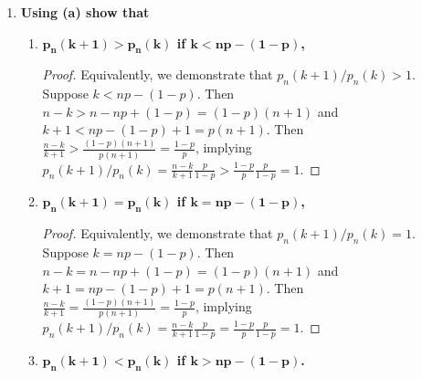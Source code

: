 \documentclass[10pt, oneside]{article}
\begin{document}
\begin{enumerate}[label=4.\arabic*]
\begin{enumerate}
	\begin{proof}
	We have $p_n (k + 1) = \binom{n}{k+1} p^{k+1} (1-p)^{n-(k+1)} = \frac{n!}{(k+1)! (n- (k+1))!} p^{k+1} (1-p)^{n-(k+1)}$ and $p_n (k) = \binom{n}{k} p^k (1-p)^{n-k} = \frac{n!}{k! (n-k)!}  p^k (1-p)^{n-k}$. It immediately follows that $p_n (k+1) / p_n (k) = [(n-k) / (k+1)] [p / (1 - p)]$.
	\end{proof}
	
	\item  \begin{tcolorbox}[
	  colback=Cerulean!5!white,
	  colframe=Cerulean!75!black]
	\textbf{Using (a) show that}
	\end{tcolorbox}
	
		\begin{enumerate}
		\item  \begin{tcolorbox}[
	  	colback=Cerulean!5!white,
	  	colframe=Cerulean!75!black]
		\textbf{$\bm{p_n (k + 1) > p_n (k)}$ if $\bm{k < np - (1 - p)}$,}
		\end{tcolorbox}
		
		\begin{proof}
		Equivalently, we demonstrate that $p_n (k+1) / p_n (k) > 1$. Suppose $k < np - (1 - p)$. Then $n - k > n - np + (1-p) = (1 - p)(n + 1)$ and $k + 1 < np - (1 - p) + 1 = p(n+1)$. Then $\frac{n-k}{k+1} > \frac{(1-p)(n+1)}{p(n+1)} = \frac{1-p}{p}$, implying $p_n (k+1) / p_n (k) = \frac{n-k}{k+1} \frac{p}{1-p} > \frac{1-p}{p} \frac{p}{1-p} = 1$.
		\end{proof}
		
		\item  \begin{tcolorbox}[
	  	colback=Cerulean!5!white,
	  	colframe=Cerulean!75!black]
		\textbf{$\bm{p_n (k + 1) = p_n (k)}$ if $\bm{k = np - (1 - p)}$,}
		\end{tcolorbox}
		
		\begin{proof}
		Equivalently, we demonstrate that $p_n (k+1) / p_n (k) = 1$. Suppose $k = np - (1 - p)$. Then $n - k = n - np + (1-p) = (1 - p)(n + 1)$ and $k + 1 = np - (1 - p) + 1 = p(n+1)$. Then $\frac{n-k}{k+1} = \frac{(1-p)(n+1)}{p(n+1)} = \frac{1-p}{p}$, implying $p_n (k+1) / p_n (k) = \frac{n-k}{k+1} \frac{p}{1-p} = \frac{1-p}{p} \frac{p}{1-p} = 1$.
		\end{proof}
		
		\item  \begin{tcolorbox}[
	  	colback=Cerulean!5!white,
	  	colframe=Cerulean!75!black]
		\textbf{$\bm{p_n (k + 1) < p_n (k)}$ if $\bm{k > np - (1 - p)}$.}
		\end{tcolorbox}
		

\end{enumerate}
\end{enumerate}
\end{enumerate}
\end{document}

